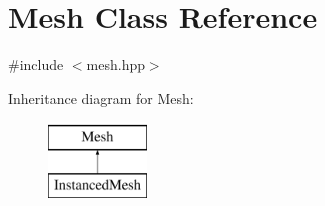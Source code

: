 \hypertarget{class_mesh}{}\section{Mesh Class Reference}
\label{class_mesh}


{\ttfamily \#include $<$mesh.\+hpp$>$}

Inheritance diagram for Mesh\+:\begin{figure}[H]
\begin{center}
\leavevmode
\includegraphics[height=2.000000cm]{class_mesh}
\end{center}
\end{figure}

